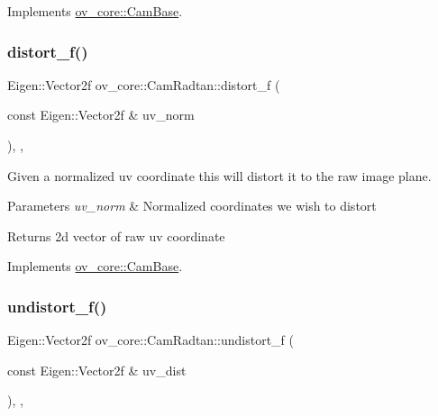 Implements \hyperlink{classov__core_1_1CamBase_a498fa2b56be008d7b59bf9927f60d5db}{ov\+\_\+core\+::\+Cam\+Base}.

\mbox{\label{classov__core_1_1CamRadtan_a022376b5a15b827bbb7dabebc8df0508}} 
\subsubsection{\texorpdfstring{distort\+\_\+f()}{distort\_f()}}
{\footnotesize\ttfamily Eigen\+::\+Vector2f ov\+\_\+core\+::\+Cam\+Radtan\+::distort\+\_\+f (\begin{DoxyParamCaption}\item[{const Eigen\+::\+Vector2f \&}]{uv\+\_\+norm }\end{DoxyParamCaption})\hspace{0.3cm}{\ttfamily [inline]}, {\ttfamily [override]}, {\ttfamily [virtual]}}



Given a normalized uv coordinate this will distort it to the raw image plane. 


\begin{DoxyParams}{Parameters}
{\em uv\+\_\+norm} & Normalized coordinates we wish to distort \\
\hline
\end{DoxyParams}
\begin{DoxyReturn}{Returns}
2d vector of raw uv coordinate 
\end{DoxyReturn}


Implements \hyperlink{classov__core_1_1CamBase_a00902793219107474dc21f762fb14556}{ov\+\_\+core\+::\+Cam\+Base}.

\mbox{\label{classov__core_1_1CamRadtan_af02fa84ed2fdc895aaaf216184aa25ef}} 
\subsubsection{\texorpdfstring{undistort\+\_\+f()}{undistort\_f()}}
{\footnotesize\ttfamily Eigen\+::\+Vector2f ov\+\_\+core\+::\+Cam\+Radtan\+::undistort\+\_\+f (\begin{DoxyParamCaption}\item[{const Eigen\+::\+Vector2f \&}]{uv\+\_\+dist }\end{DoxyParamCaption})\hspace{0.3cm}{\ttfamily [inline]}, {\ttfamily [override]}, {\ttfamily [virtual]}}




